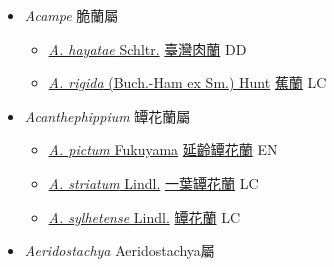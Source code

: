 
  \begin{itemize}
 \item[] \textit{Acampe} 脆蘭屬
                    
  \begin{itemize}
        \item[] \href{http://www.theplantlist.org/tpl1.1/search?q=Acampe+hayatae}{\textit{A. hayatae} Schltr.}   \href{\detokenize{http://taibnet.sinica.edu.tw/chi/taibnet_species_list.php?T2=臺灣肉蘭&T2_new_value=true&fr=y}}{臺灣肉蘭} DD
        \item[] \href{http://www.theplantlist.org/tpl1.1/search?q=Acampe+rigida}{\textit{A. rigida} (Buch.-Ham ex Sm.) Hunt}   \href{\detokenize{http://taibnet.sinica.edu.tw/chi/taibnet_species_list.php?T2=蕉蘭&T2_new_value=true&fr=y}}{蕉蘭} LC
  \end{itemize}
 \item[] \textit{Acanthephippium} 罈花蘭屬
                    
  \begin{itemize}
        \item[] \href{http://www.theplantlist.org/tpl1.1/search?q=Acanthephippium+pictum}{\textit{A. pictum} Fukuyama}   \href{\detokenize{http://taibnet.sinica.edu.tw/chi/taibnet_species_list.php?T2=延齡罈花蘭&T2_new_value=true&fr=y}}{延齡罈花蘭} EN
        \item[] \href{http://www.theplantlist.org/tpl1.1/search?q=Acanthephippium+striatum}{\textit{A. striatum} Lindl.}   \href{\detokenize{http://taibnet.sinica.edu.tw/chi/taibnet_species_list.php?T2=一葉罈花蘭&T2_new_value=true&fr=y}}{一葉罈花蘭} LC
        \item[] \href{http://www.theplantlist.org/tpl1.1/search?q=Acanthephippium+sylhetense}{\textit{A. sylhetense} Lindl.}   \href{\detokenize{http://taibnet.sinica.edu.tw/chi/taibnet_species_list.php?T2=罈花蘭&T2_new_value=true&fr=y}}{罈花蘭} LC
  \end{itemize}
 \item[] \textit{Aeridostachya} Aeridostachya屬
                    

\end{itemize}
